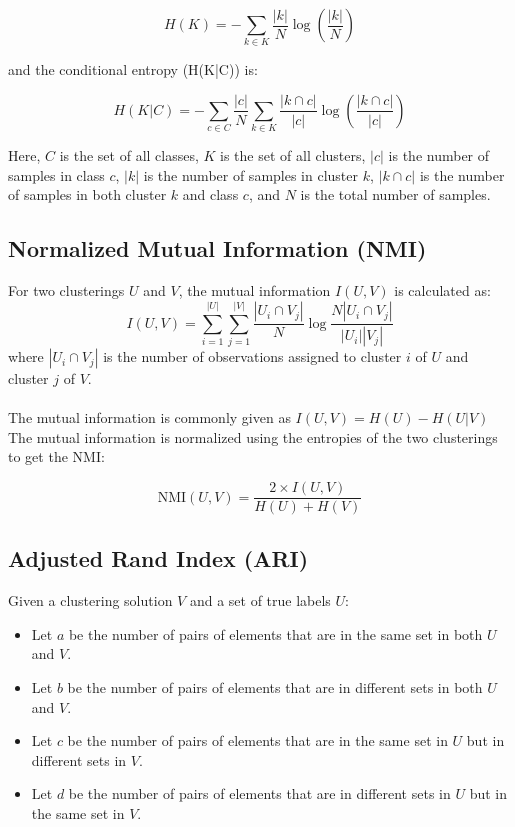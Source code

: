 \documentclass[a4paper,12pt]{article}
\begin{document}
		\[ H(K) = - \sum_{k \in K} \frac{|k|}{N} \log \left( \frac{|k|}{N} \right) \]
		
		and the conditional entropy (H(K|C)) is:
		
		\[ H(K|C) = - \sum_{c \in C} \frac{|c|}{N} \sum_{k \in K} \frac{|k \cap c|}{|c|} \log \left( \frac{|k \cap c|}{|c|} \right) \]
		
		Here, $C$ is the set of all classes, $K$ is the set of all clusters, $|c|$ is the number of samples in class $c$, $|k|$ is the number of samples in cluster $k$, $|k \cap c|$ is the number of samples in both cluster $k$ and class $c$, and $N$ is the total number of samples.
	
	\subsection*{Normalized Mutual Information (NMI)}
	
	For two clusterings $U$ and $V$, the mutual information $I(U, V)$ is calculated as: 
	\[ I(U, V) = \sum_{i=1}^{|U|} \sum_{j=1}^{|V|} \frac{|U_i \cap V_j|}{N} \log \frac{N|U_i \cap V_j|}{|U_i| |V_j|} \] 
	where $|U_i \cap V_j|$ is the number of observations assigned to cluster $i$ of $U$ and cluster $j$ of $V$.\\
	\\
	The mutual information is commonly given as $I(U,V) = H(U) - H(U|V)$
	The mutual information is normalized using the entropies of the two clusterings to get the NMI:
	
	\[\text{NMI}(U, V) = \frac{2 \times I(U, V)}{H(U)+H(V)} \]

	
	\subsection*{Adjusted Rand Index (ARI)} 
		Given a clustering solution $V$ and a set of true labels $U$: \\
		\begin{itemize}
			\item Let $a$ be the number of pairs of elements that are in the same set in both $U$ and $V$. \\
			\item Let $b$ be the number of pairs of elements that are in different sets in both $U$ and $V$. \\
			\item Let $c$ be the number of pairs of elements that are in the same set in $U$ but in different sets in $V$.\\
			\item Let $d$ be the number of pairs of elements that are in different sets in $U$ but in the same set in $V$.\\
		\end{itemize}
		
\end{document}
